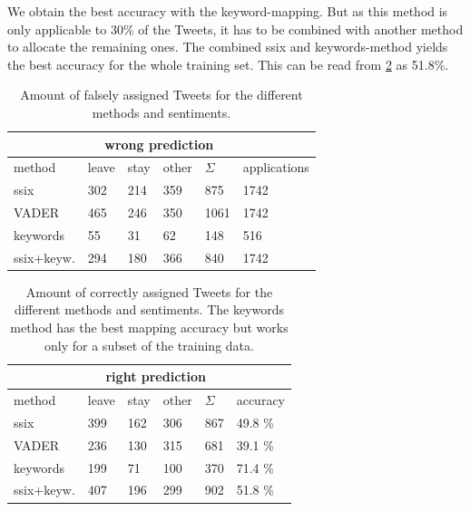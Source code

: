 \documentclass{emulateapj}
\begin{document}
We obtain the best accuracy with the keyword-mapping. 
But as this method is only applicable to 30\% of the Tweets, it has to be combined with another method to allocate the remaining ones. 
The combined ssix and keywords-method yields the best accuracy for the whole training set.
This can be read from \cref{table:rightpred} as 51.8\%.
\newline\newline
\begin{table}	
\centering
{\ttfamily
  \begin{tabular}{|l|l|l|l|l|l|}
    \hline
    & \multicolumn{4}{|c|}{wrong prediction} & \\ \hline
     method & leave & stay & other & $\Sigma$ & applications \\ \hline \hline
    ssix & 302 & 214 & 359 & 875 & 1742 \\ \hline
    VADER & 465 & 246 & 350 & 1061 & 1742\\ \hline
    keywords & 55 & 31 & 62 & 148 & 516 \\ \hline
    ssix+keyw. & 294 & 180 & 366 & 840 & 1742 \\ \hline
  \end{tabular}
}
\caption{\textnormal{Amount of falsely assigned Tweets for the different methods and sentiments.}}
\label{table:wrongpred}
\end{table}
%
%
\newline\newline
\newline\newline
\begin{table}
\centering
{\ttfamily
  \begin{tabular}{|l|l|l|l|l|l|}
    \hline
	& \multicolumn{4}{|c|}{right prediction} & \\ \hline
      method & leave & stay & other & $\Sigma$ & accuracy \\ \hline \hline
	ssix & 399 & 162 & 306 & 867 & 49.8 \% \\ \hline
	VADER & 236 & 130 & 315 & 681 & 39.1 \% \\ \hline
	keywords & 199 & 71 & 100 & 370 & 71.4 \%\\ \hline
	ssix+keyw. & 407 & 196 & 299 & 902 & 51.8 \%\\ \hline
  \end{tabular}
}
\caption{\textnormal{Amount of correctly assigned Tweets for the different methods and sentiments. The keywords method has the best mapping accuracy but works only for a subset of the training data.}}
\label{table:rightpred}
\end{table}
\end{document}

